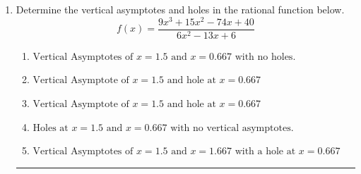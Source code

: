 \documentclass[14pt]{extbook}
\newcommand{\litem}[1]{\item#1\hspace*{-1cm}\rule{\textwidth}{0.4pt}}
\begin{document}
\begin{enumerate}
{\begin{enumerate}[label=\Alph*.]
\end{enumerate} }
\litem{
Determine the vertical asymptotes and holes in the rational function below.\[ f(x) = \frac{9x^{3} +15 x^{2} -74 x + 40}{6x^{2} -13 x + 6} \]\begin{enumerate}[label=\Alph*.]
\item \( \text{Vertical Asymptotes of } x = 1.5 \text{ and } x = 0.667 \text{ with no holes.} \)
\item \( \text{Vertical Asymptote of } x = 1.5 \text{ and hole at } x = 0.667 \)
\item \( \text{Vertical Asymptote of } x = 1.5 \text{ and hole at } x = 0.667 \)
\item \( \text{Holes at } x = 1.5 \text{ and } x = 0.667 \text{ with no vertical asymptotes.} \)
\item \( \text{Vertical Asymptotes of } x = 1.5 \text{ and } x = 1.667 \text{ with a hole at } x = 0.667 \)

\end{enumerate} }
\end{enumerate}
\end{document}
